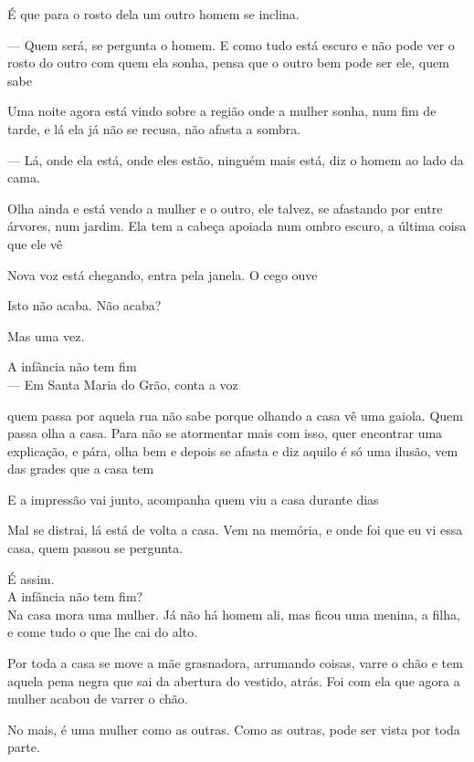 É que para o rosto dela um outro homem se inclina.

--- Quem será, se pergunta o homem. E como tudo está escuro e não pode ver
o rosto do outro com quem ela sonha, pensa que o outro bem pode ser ele,
quem sabe

Uma noite agora está vindo sobre a região onde a mulher sonha, num fim
de tarde, e lá ela já não se recusa, não afasta a sombra.

--- Lá, onde ela está, onde eles estão, ninguém mais está, diz o homem ao
lado da cama.

Olha ainda e está vendo a mulher e o outro, ele talvez, se afastando por
entre árvores, num jardim. Ela tem a cabeça apoiada num ombro escuro, a
última coisa que ele vê

\breakk

\vspace*{4cm}

Nova voz está chegando, entra pela janela. O cego ouve

Isto não acaba. Não acaba?

Mas uma vez.

A infância não tem fim\\

--- Em Santa Maria do Grão, conta a voz

quem passa por aquela rua não sabe porque olhando a casa vê uma gaiola.
Quem passa olha a casa. Para não se atormentar mais com isso, quer
encontrar uma explicação, e pára, olha bem e depois se afasta e diz
aquilo é só uma ilusão, vem das grades que a casa tem

E a impressão vai junto, acompanha quem viu a casa durante dias

Mal se distrai, lá está de volta a casa. Vem na memória, e onde foi que
eu vi essa casa, quem passou se pergunta.

É assim.\\

A infância não tem fim?\\

Na casa mora uma mulher. Já não há homem ali, mas ficou uma menina, a
filha, e come tudo o que lhe cai do alto.

Por toda a casa se move a mãe grasnadora, arrumando coisas, varre o chão
e tem aquela pena negra que sai da abertura do vestido, atrás. Foi com
ela que agora a mulher acabou de varrer o chão.

No mais, é uma mulher como as outras. Como as outras, pode ser vista por
toda parte.

